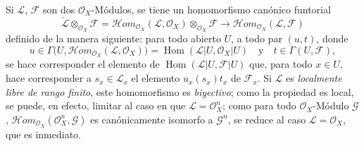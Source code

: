 \begin{env}[5.4.2]
\label{0.5.4.2-fr}
Si $\mathcal{L}$, $\mathcal{F}$ son dos $\mathcal{O}_X$-Módulos, se tiene un
homomorfismo canónico funtorial
\[
  \check{\mathcal{L}}\otimes_{\mathcal{O}_X}\mathcal{F}
  =\mathcal{H}\!om_{\mathcal{O}_X}(\mathcal{L},\mathcal{O}_X)
   \otimes_{\mathcal{O}_X}\mathcal{F}
  \longrightarrow
  \mathcal{H}\!om_{\mathcal{O}_X}(\mathcal{L},\mathcal{F})
  \tag{5.4.2.1}\label{0.5.4.2.1-fr}
\]
definido de la manera siguiente: para todo abierto $U$, a todo par $(u,t)$, donde
\[
  u\in\Gamma\bigl(U,
    \mathcal{H}\!om_{\mathcal{O}_X}(\mathcal{L},\mathcal{O}_X)\bigr)
  =\operatorname{Hom}(\mathcal{L}|U,\mathcal{O}_X|U)
  \quad\text{y}\quad
  t\in\Gamma(U,\mathcal{F}),
\]
se hace corresponder el elemento de
$\operatorname{Hom}(\mathcal{L}|U,\mathcal{F}|U)$ que, para todo $x\in U$,
hace corresponder a $s_x\in\mathcal{L}_x$ el elemento $u_x(s_x)t_x$ de
$\mathcal{F}_x$. Si $\mathcal{L}$ es \emph{localmente libre de rango finito},
este homomorfismo es \emph{biyectivo}; como la propiedad es local, se puede,
en efecto, limitar al caso en que $\mathcal{L}=\mathcal{O}_X^n$; como para todo
$\mathcal{O}_X$-Módulo $\mathcal{G}$,
$\mathcal{H}\!om_{\mathcal{O}_X}(\mathcal{O}_X^n,\mathcal{G})$ es
canónicamente isomorfo a $\mathcal{G}^n$, se reduce al caso
$\mathcal{L}=\mathcal{O}_X$, que es inmediato.
\end{env}

